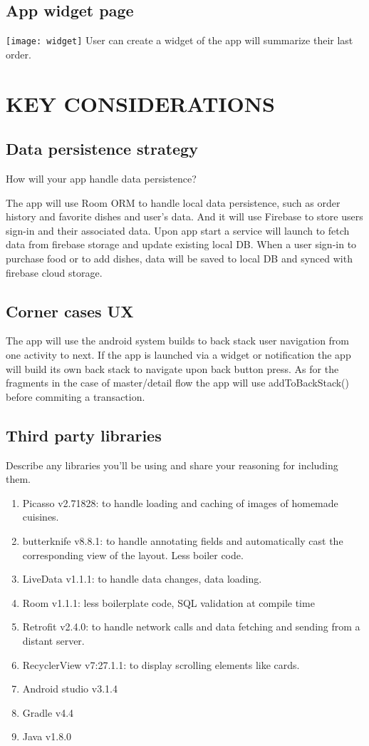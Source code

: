 \documentclass{article}
\begin{document}
  \subsection{App widget page}
    \texttt{[image: widget]}
    User can create a widget of the app will summarize their last order.




\section{KEY CONSIDERATIONS}
\subsection{Data persistence strategy}
  How will your app handle data persistence? 

  The app will use Room ORM to handle local data persistence, such as order history and favorite dishes and user’s data. And it will use Firebase to store users sign-in and their associated data.
  Upon app start a service will launch to fetch data from firebase storage and update existing local DB.
  When a user sign-in to purchase food or to add dishes, data will be saved to local DB and synced with firebase cloud storage.

\subsection{Corner cases UX}
  The app will use the android system builds to back stack user navigation from one activity to next.
  If the app is launched via a widget or notification the app will build its own back stack to navigate upon back button press.
  As for the fragments in the case of master/detail flow the app will use addToBackStack() before commiting a transaction.

\subsection{Third party libraries}
  Describe any libraries you’ll be using and share your reasoning for including them.

  \begin{enumerate}
    \item Picasso v2.71828: to handle loading and caching of images of homemade cuisines. 
    \item butterknife v8.8.1: to handle annotating fields and automatically cast the corresponding view of the layout. Less boiler code.
    \item LiveData v1.1.1: to handle data changes, data loading.
    \item Room v1.1.1: less boilerplate code, SQL validation at compile time 
    \item Retrofit v2.4.0: to handle network calls and data fetching and sending from a distant server.
    \item RecyclerView v7:27.1.1: to display scrolling elements like cards.
    \item Android studio v3.1.4
    \item Gradle v4.4
    \item Java v1.8.0
  \end{enumerate}
\end{document}

